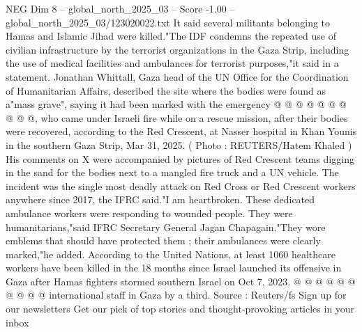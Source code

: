 \begin{textsample}{NEG Dim 8 – global\_north\_2025\_03 – Score -1.00 – global\_north\_2025\_03/123020022.txt}
It said several militants belonging to Hamas and Islamic Jihad were killed."The IDF condemns the repeated use of civilian infrastructure by the terrorist organizations in the Gaza Strip, including the use of medical facilities and ambulances for terrorist purposes,"it said in a statement.
Jonathan Whittall, Gaza head of the UN Office for the Coordination of Humanitarian Affairs, described the site where the bodies were found as a"mass grave", saying it had been marked with the emergency @ @ @ @ @ @ @ @ @ @, who came under Israeli fire while on a rescue mission, after their bodies were recovered, according to the Red Crescent, at Nasser hospital in Khan Younis in the southern Gaza Strip, Mar 31, 2025. ( Photo : REUTERS/Hatem Khaled ) His comments on X were accompanied by pictures of Red Crescent teams digging in the sand for the bodies next to a mangled fire truck and a UN vehicle.
The incident was the single most deadly attack on Red Cross or Red Crescent workers anywhere since 2017, the IFRC said."I am heartbroken.
These dedicated ambulance workers were responding to wounded people.
They were humanitarians,"said IFRC Secretary General Jagan Chapagain."They wore emblems that should have protected them ; their ambulances were clearly marked,"he added.
According to the United Nations, at least 1060 healthcare workers have been killed in the 18 months since Israel launched its offensive in Gaza after Hamas fighters stormed southern Israel on Oct 7, 2023. @ @ @ @ @ @ @ @ @ @ international staff in Gaza by a third.
Source : Reuters/fs Sign up for our newsletters Get our pick of top stories and thought-provoking articles in your inbox

\end{textsample}
